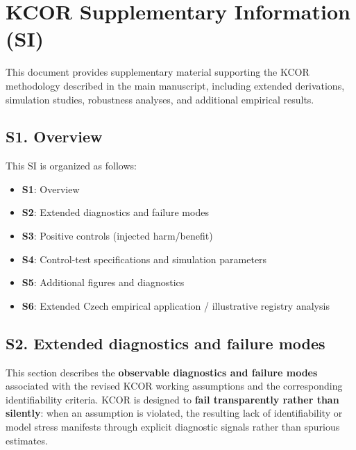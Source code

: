 \documentclass[
]{article}
\author{}
\date{}
\providecommand{\tightlist}{%
  \setlength{\itemsep}{0pt}\setlength{\parskip}{0pt}}
\newcounter{kcorappendix}
\renewcommand{\thefigure}{\Alph{kcorappendix}.\arabic{figure}}%
\renewcommand{\thetable}{\Alph{kcorappendix}.\arabic{table}}%
\begin{document}
\section{KCOR Supplementary Information
(SI)}\label{kcor-supplementary-information-si}

\renewcommand{\thefigure}{S\arabic{figure}}%
\setcounter{figure}{0}%
\renewcommand{\thetable}{S\arabic{table}}%
\setcounter{table}{0}%

This document provides supplementary material supporting the KCOR
methodology described in the main manuscript, including extended
derivations, simulation studies, robustness analyses, and additional
empirical results.

\subsection{S1. Overview}\label{s1.-overview}

This SI is organized as follows:

\begin{itemize}
\tightlist
\item
  \textbf{S1}: Overview
\item
  \textbf{S2}: Extended diagnostics and failure modes
\item
  \textbf{S3}: Positive controls (injected harm/benefit)
\item
  \textbf{S4}: Control-test specifications and simulation parameters
\item
  \textbf{S5}: Additional figures and diagnostics
\item
  \textbf{S6}: Extended Czech empirical application / illustrative
  registry analysis
\end{itemize}

\subsection{S2. Extended diagnostics and failure
modes}\label{s2.-extended-diagnostics-and-failure-modes}

This section describes the \textbf{observable diagnostics and failure
modes} associated with the revised KCOR working assumptions and the
corresponding identifiability criteria. KCOR is designed to \textbf{fail
transparently rather than silently}: when an assumption is violated, the
resulting lack of identifiability or model stress manifests through
explicit diagnostic signals rather than spurious estimates.
\end{document}
